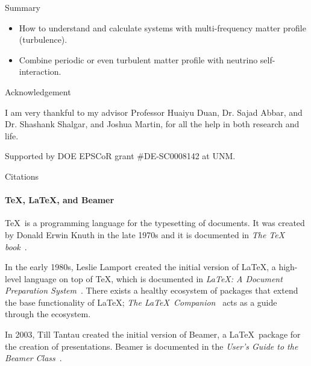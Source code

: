 \documentclass[9pt]{beamer}
\begin{document}
\begin{darkframes}
\begin{frame}{Summary}
\begin{itemize}\color{red}
 \item
 How to understand and calculate systems with multi-frequency matter profile (turbulence).
 \item
 Combine periodic or even turbulent matter profile with neutrino self-interaction.
\end{itemize}




\end{frame}



\begin{frame}{Acknowledgement}

I am very thankful to my advisor Professor Huaiyu Duan, Dr. Sajad Abbar, and Dr. Shashank Shalgar, and Joshua Martin, for all the help in both research and life.

Supported by DOE EPSCoR grant \#DE-SC0008142 at UNM.

\end{frame}






    \begin{frame}[label=citations]{Citations}
      \framesubtitle{\TeX, \LaTeX, and Beamer}

      \justifying\TeX\ is a programming language for the typesetting
      of documents. It was created by Donald Erwin Knuth in the late
      1970s and it is documented in \emph{The \TeX
      book}~\cite{knuth84}.

      In the early 1980s, Leslie Lamport created the initial version
      of \LaTeX, a high-level language on top of \TeX, which is
      documented in \emph{\LaTeX : A Document Preparation
      System}~\cite{lamport94}. There exists a healthy ecosystem of
      packages that extend the base functionality of \LaTeX;
      \emph{The \LaTeX\ Companion}~\cite{MG94} acts as a guide
      through the ecosystem.

      In 2003, Till Tantau created the initial version of Beamer, a
      \LaTeX\ package for the creation of presentations. Beamer is
      documented in the \emph{User's Guide to the Beamer
      Class}~\cite{tantau04}.
    \end{frame}


\end{darkframes}
\end{document}
